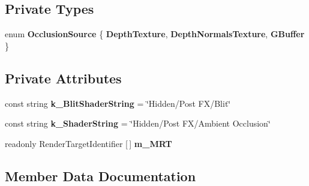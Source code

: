 \subsection*{Private Types}
\begin{DoxyCompactItemize}
\item 
\mbox{\label{class_unity_engine_1_1_post_processing_1_1_ambient_occlusion_component_acd3f992f84c91d742f1f7715065fede0}} 
enum {\bfseries Occlusion\+Source} \{ {\bfseries Depth\+Texture}, 
{\bfseries Depth\+Normals\+Texture}, 
{\bfseries G\+Buffer}
 \}
\end{DoxyCompactItemize}
\subsection*{Private Attributes}
\begin{DoxyCompactItemize}
\item 
\mbox{\label{class_unity_engine_1_1_post_processing_1_1_ambient_occlusion_component_a0394e96a1c17573f8e7d249b62eda9a1}} 
const string {\bfseries k\+\_\+\+Blit\+Shader\+String} = \char`\"{}Hidden/Post FX/Blit\char`\"{}
\item 
\mbox{\label{class_unity_engine_1_1_post_processing_1_1_ambient_occlusion_component_aab5afd366640d5f65987898bdd3d5ac5}} 
const string {\bfseries k\+\_\+\+Shader\+String} = \char`\"{}Hidden/Post FX/Ambient Occlusion\char`\"{}
\item 
readonly Render\+Target\+Identifier \mbox{[}$\,$\mbox{]} {\bfseries m\+\_\+\+M\+RT}
\end{DoxyCompactItemize}


\subsection{Member Data Documentation}
\mbox{\label{class_unity_engine_1_1_post_processing_1_1_ambient_occlusion_component_a3d271f1950fca25d561790449e95f9b0}} 

